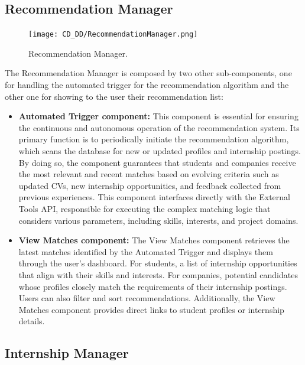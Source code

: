 \begin{itemize}
\end{itemize}

\subsection{Recommendation Manager}
\label{subsec:recommendation_manager}%

\begin{figure}[H]
    \begin{center}
        \texttt{[image: CD\_DD/RecommendationManager.png]}
        \caption{Recommendation Manager.}
        \label{fig:recommendation_manager}%
    \end{center}
\end{figure}

\noindent The Recommendation Manager is composed by two other sub-components, one for handling the automated trigger for the recommendation algorithm and the other one for showing to the user their recommendation list:

\begin{itemize}
    \item \textbf{Automated Trigger component:} This component is essential for ensuring the continuous and autonomous operation of the recommendation system. Its primary function is to periodically initiate the recommendation algorithm, which scans the database for new or updated profiles and internship postings. By doing so, the component guarantees that students and companies receive the most relevant and recent matches based on evolving criteria such as updated CVs, new internship opportunities, and feedback collected from previous experiences. This component interfaces directly with the External Tools API, responsible for executing the complex matching logic that considers various parameters, including skills, interests, and project domains.
    \item \textbf{View Matches component:} The View Matches component retrieves the latest matches identified by the Automated Trigger and displays them through the user’s dashboard. For students, a list of internship opportunities that align with their skills and interests. For companies, potential candidates whose profiles closely match the requirements of their internship postings. Users can also filter and sort recommendations. Additionally, the View Matches component provides direct links to student profiles or internship details.
\end{itemize}

\subsection{Internship Manager}
\label{subsec:internship_manager}%

